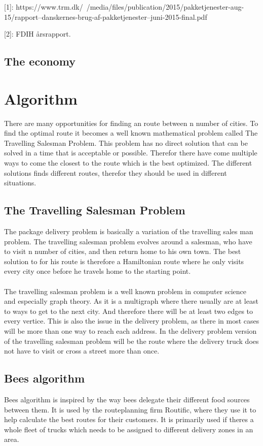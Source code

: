 \documentclass[12pt]{report}
\begin{document}
[1]: https://www.trm.dk/~/media/files/publication/2015/pakketjenester-aug-15/rapport--danskernes-brug-af-pakketjenester--juni-2015-final.pdf

[2]: FDIH årsrapport.





\subsection{The economy}



\section{Algorithm}
There are many opportunities for finding an route between n number of cities. To find the optimal route it becomes a well known mathematical problem called The Travelling Salesman Problem. This problem has no direct solution that can be solved in a time that is acceptable or possible. Therefor there have come multiple ways to come the closest to the route which is the best optimized. The different solutions finds different routes, therefor they should be used in different situations.

\subsection{The Travelling Salesman Problem}
The package delivery problem is basically a variation of the travelling sales man problem. The travelling salesman problem evolves around a salesman, who have to visit n number of cities, and then return home to his own town. The best solution to for his route is therefore a Hamiltonian route where he only visits every city once before he travels home to the starting point. \\ \\
The travelling salesman problem is a well known problem in computer science and especially graph theory. As it is a multigraph where there usually are at least to ways to get to the next city. And therefore there will be at least two edges to every vertice. This is also the issue in the delivery problem, as there in most cases will be more than one way to reach each address. In the delivery problem version of the travelling salesman problem will be the route where the delivery truck does not have to visit or cross a street more than once.    


\subsection{Bees algorithm}
Bees algorithm is inspired by the way bees delegate their different food sources between them. It is used by the routeplanning firm Routific, where they use it to help calculate the best routes for their customers. It is primarily used if theres a whole fleet of trucks which needs to be assigned to different delivery zones in an area.   
\end{document}
